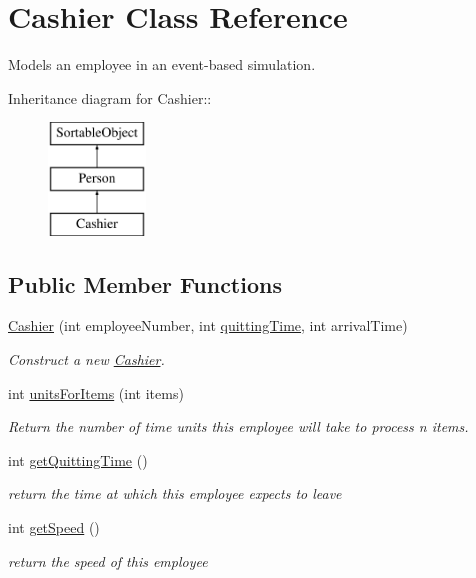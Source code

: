 \hypertarget{class_cashier}{
\section{Cashier Class Reference}
\label{class_cashier}
}
Models an employee in an event-based simulation.  


Inheritance diagram for Cashier::\begin{figure}[H]
\begin{center}
\leavevmode
\includegraphics[height=3cm]{class_cashier}
\end{center}
\end{figure}
\subsection*{Public Member Functions}
\begin{CompactItemize}
\item 
\hyperlink{class_cashier_f2d5ea95917be1e7ae459b14299b6341}{Cashier} (int employeeNumber, int \hyperlink{class_cashier_c190b84e4cb0074a9e1b6c2fa3d1cda9}{quittingTime}, int arrivalTime)
\begin{CompactList}\small\item\em Construct a new \hyperlink{class_cashier}{Cashier}. \item\end{CompactList}\item 
int \hyperlink{class_cashier_d5c921d4dfccb88928f8cd501397249e}{unitsForItems} (int items)
\begin{CompactList}\small\item\em Return the number of time units this employee will take to process n items. \item\end{CompactList}\item 
\hypertarget{class_cashier_da5b4a10dca4c7b9a561387653ca4e04}{
int \hyperlink{class_cashier_da5b4a10dca4c7b9a561387653ca4e04}{getQuittingTime} ()}
\label{class_cashier_da5b4a10dca4c7b9a561387653ca4e04}

\begin{CompactList}\small\item\em return the time at which this employee expects to leave \item\end{CompactList}\item 
\hypertarget{class_cashier_cd10cd48f208ec3f472f6c83bbed282e}{
int \hyperlink{class_cashier_cd10cd48f208ec3f472f6c83bbed282e}{getSpeed} ()}
\label{class_cashier_cd10cd48f208ec3f472f6c83bbed282e}

\begin{CompactList}\small\item\em return the speed of this employee \item\end{CompactList}\end{CompactItemize}
